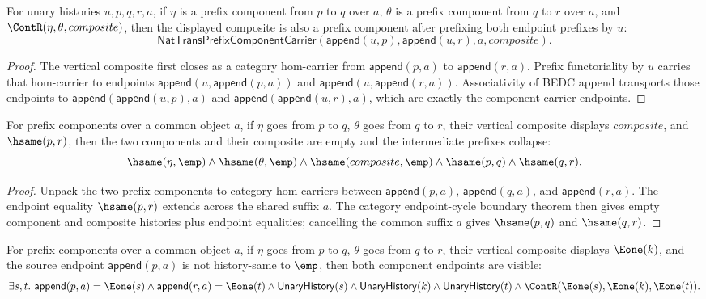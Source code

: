 \begin{theorem}
\label{thm:nattrans-prefix-component-carrier-prefix-vert-comp-closed}
For unary histories \(u,p,q,r,a\), if \(\eta\) is a prefix component from
\(p\) to \(q\) over \(a\), \(\theta\) is a prefix component from \(q\) to
\(r\) over \(a\), and \(\ContR(\eta,\theta,composite)\), then the displayed
composite is also a prefix component after prefixing both endpoint prefixes by
\(u\):
$$
\mathsf{NatTransPrefixComponentCarrier}(\mathsf{append}(u,p),
\mathsf{append}(u,r),a,composite).
$$
\end{theorem}
\begin{proof}
The vertical composite first closes as a category hom-carrier from
\(\mathsf{append}(p,a)\) to \(\mathsf{append}(r,a)\). Prefix functoriality by
\(u\) carries that hom-carrier to endpoints
\(\mathsf{append}(u,\mathsf{append}(p,a))\) and
\(\mathsf{append}(u,\mathsf{append}(r,a))\). Associativity of BEDC append
transports those endpoints to
\(\mathsf{append}(\mathsf{append}(u,p),a)\) and
\(\mathsf{append}(\mathsf{append}(u,r),a)\), which are exactly the component
carrier endpoints.
\end{proof}
\begin{theorem}
\label{thm:nattrans-prefix-component-carrier-vert-comp-endpoint-cycle-boundary}
For prefix components over a common object $a$, if $\eta$ goes from $p$ to
$q$, $\theta$ goes from $q$ to $r$, their vertical composite displays
$composite$, and $\hsame(p,r)$, then the two components and their composite
are empty and the intermediate prefixes collapse:
$$
\hsame(\eta,\emp)\land \hsame(\theta,\emp)\land
\hsame(composite,\emp)\land \hsame(p,q)\land\hsame(q,r).
$$
\end{theorem}
\begin{proof}
Unpack the two prefix components to category hom-carriers between
$\mathsf{append}(p,a)$, $\mathsf{append}(q,a)$, and $\mathsf{append}(r,a)$.
The endpoint equality $\hsame(p,r)$ extends across the shared suffix $a$.
The category endpoint-cycle boundary theorem then gives empty component and
composite histories plus endpoint equalities; cancelling the common suffix
$a$ gives $\hsame(p,q)$ and $\hsame(q,r)$.
\end{proof}
\begin{theorem}
\label{thm:nattrans-prefix-component-carrier-vert-comp-nonempty-result-source-visible}
For prefix components over a common object $a$, if $\eta$ goes from $p$ to
$q$, $\theta$ goes from $q$ to $r$, their vertical composite displays
$\Eone(k)$, and the source endpoint $\mathsf{append}(p,a)$ is not
history-same to $\emp$, then both component endpoints are visible:
$$
\exists s,t.\ \mathsf{append}(p,a)=\Eone(s)\wedge
\mathsf{append}(r,a)=\Eone(t)\wedge
\mathsf{UnaryHistory}(s)\wedge\mathsf{UnaryHistory}(k)\wedge
\mathsf{UnaryHistory}(t)\wedge
\ContR(\Eone(s),\Eone(k),\Eone(t)).
$$
\end{theorem}

